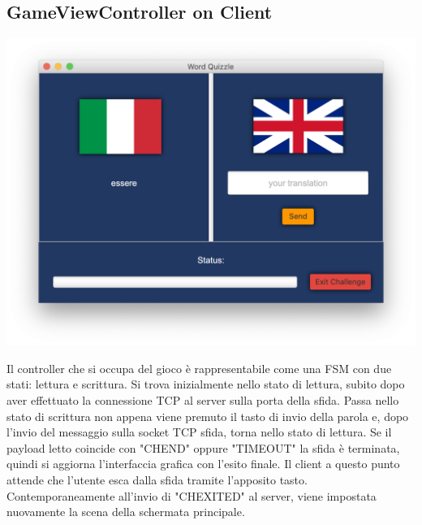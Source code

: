 \documentclass{article}
\begin{document}
\subsection{GameViewController on Client}
\begin{center}
\includegraphics[scale=0.5]{quizzlegame.png}
\end{center}
Il controller che si occupa del gioco è rappresentabile come una FSM con due stati: lettura e scrittura. Si trova inizialmente nello stato di lettura, subito dopo aver effettuato la connessione TCP al server sulla porta della sfida. Passa nello stato di scrittura non appena viene premuto il tasto di invio della parola e, dopo l'invio del messaggio sulla socket TCP sfida, torna nello stato di lettura.
Se il payload letto coincide con "CHEND" oppure "TIMEOUT" la sfida è terminata, quindi si aggiorna l'interfaccia grafica con l'esito finale. Il client a questo punto attende che l'utente esca dalla sfida tramite l'apposito tasto. Contemporaneamente all'invio di "CHEXITED" al server, viene impostata nuovamente la scena della schermata principale.



\end{document}
